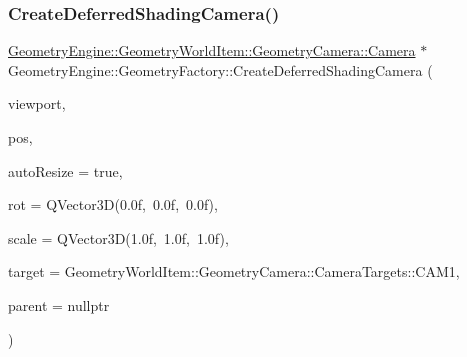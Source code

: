 \subsubsection{\texorpdfstring{CreateDeferredShadingCamera()}{CreateDeferredShadingCamera()}\hspace{0.1cm}{\footnotesize\ttfamily [2/2]}}
{\footnotesize\ttfamily \mbox{\hyperlink{class_geometry_engine_1_1_geometry_world_item_1_1_geometry_camera_1_1_camera}{Geometry\+Engine\+::\+Geometry\+World\+Item\+::\+Geometry\+Camera\+::\+Camera}} $\ast$ Geometry\+Engine\+::\+Geometry\+Factory\+::\+Create\+Deferred\+Shading\+Camera (\begin{DoxyParamCaption}\item[{\mbox{\hyperlink{class_geometry_engine_1_1_geometry_item_utils_1_1_viewport}{Geometry\+Item\+Utils\+::\+Viewport}} $\ast$}]{viewport,  }\item[{const Q\+Vector3D \&}]{pos,  }\item[{bool}]{auto\+Resize = {\ttfamily true},  }\item[{const Q\+Vector3D \&}]{rot = {\ttfamily QVector3D(0.0f,~0.0f,~0.0f)},  }\item[{const Q\+Vector3D \&}]{scale = {\ttfamily QVector3D(1.0f,~1.0f,~1.0f)},  }\item[{const \mbox{\hyperlink{namespace_geometry_engine_1_1_geometry_world_item_1_1_geometry_camera_a3766848bae97ff8203fa26907ac359ef}{Geometry\+World\+Item\+::\+Geometry\+Camera\+::\+Camera\+Targets}} \&}]{target = {\ttfamily GeometryWorldItem\+:\+:GeometryCamera\+:\+:CameraTargets\+:\+:CAM1},  }\item[{\mbox{\hyperlink{class_geometry_engine_1_1_geometry_world_item_1_1_world_item}{Geometry\+World\+Item\+::\+World\+Item}} $\ast$}]{parent = {\ttfamily nullptr} }\end{DoxyParamCaption})\hspace{0.3cm}{\ttfamily [static]}}

